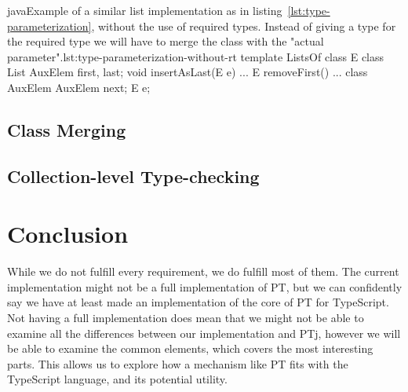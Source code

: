\begin{code}{java}{Example of a similar list implementation as in listing~\vref{lst:type-parameterization}, without the use of required types. Instead of giving a type for the required type we will have to merge the class  with the "actual parameter".}{lst:type-parameterization-without-rt}
    template ListsOf {
        class E { }
        class List {
            AuxElem first, last;
            void insertAsLast(E e) { ... }
            E removeFirst() { ... }
        }
        class AuxElem {
            AuxElem next;
            E e;
        }
    }
\end{code}

\subsection{Class Merging}

\subsection{Collection-level Type-checking}\label{subsec:implementation-collection-level-type-checking}

\section{Conclusion}\label{sec:requirements-conclusion}

While we do not fulfill every requirement, we do fulfill most of them.
The current implementation might not be a full implementation of PT, but we can confidently say we have at least made an implementation of the core of PT for TypeScript.
Not having a full implementation does mean that we might not be able to examine all the differences between our implementation and PTj, however we will be able to examine the common elements, which covers the most interesting parts.
This allows us to explore how a mechanism like PT fits with the TypeScript language, and its potential utility.
